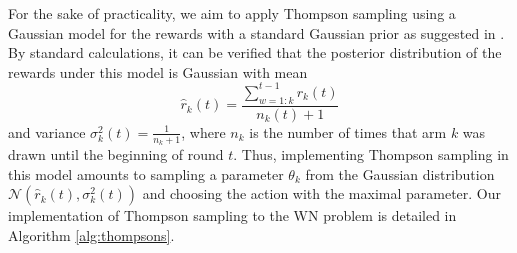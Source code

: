 \documentclass[preprint,12pt]{elsarticle}
\begin{document}
For the sake of practicality, we aim to apply Thompson sampling using a Gaussian model for the rewards with a standard Gaussian prior as suggested in \cite{agrawal2013further}. By standard calculations, it can be verified that the posterior distribution of the rewards under this model is Gaussian with mean 
\begin{equation}
\hat{r}_k(t) = \frac{\sum_{w=1:k}^{t-1} r_k(t) }{n_k(t) + 1}
\nonumber
\end{equation}
and variance $\sigma_k^2(t) = \frac{1}{n_k + 1}$, where $n_k$ is the number of times that arm $k$ was drawn until the beginning of round $t$. Thus, implementing Thompson sampling in this model amounts to sampling a parameter $\theta_k$ from the Gaussian distribution $\mathcal{N}\left(\hat{r}_k(t),\sigma_k^2(t)\right)$ and choosing the action with the maximal parameter. Our implementation of Thompson sampling to the WN problem is detailed in Algorithm \ref{alg:thompsons}.	
\end{document}
